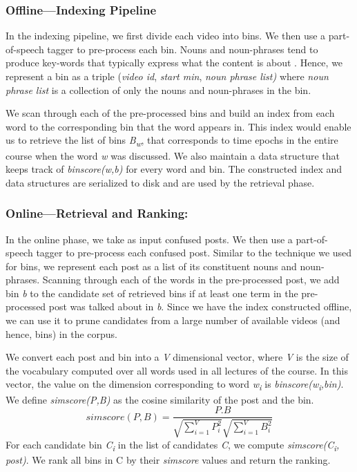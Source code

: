 \documentclass{edm_template}
\begin{document}
\subsubsection{Offline---Indexing Pipeline}
In the indexing pipeline, we first divide each video into bins. We then use a part-of-speech tagger \cite{nltk} to pre-process each bin. Nouns and noun-phrases tend to produce key-words that typically express what the content is about \cite{hulth2003improved}. Hence, we represent a bin as a triple (\textit{video \textunderscore id}, \textit{start \textunderscore min}, \textit{noun \textunderscore phrase \textunderscore list)} where \textit{noun \textunderscore phrase \textunderscore list} is a collection of only the nouns and noun-phrases in the bin.

We scan through each of the pre-processed bins and build an index from each word to the corresponding bin that the word appears in. This index would enable us to retrieve the list of bins \textit{B\textsubscript{w}}, that corresponds to time epochs in the entire course when the word \textit{w} was discussed. We also maintain a data structure that keeps track of \textit{bin\textunderscore score(w,b)} for every word and bin. The constructed index and data structures are serialized to disk and are used by the retrieval phase.
\vspace{-0.3cm}
\subsubsection{Online---Retrieval and Ranking:}
In the online phase, we take as input confused posts. We then use a part-of-speech tagger \cite{nltk} to pre-process each confused post. Similar to the technique we used for bins, we represent each post as a list of its constituent nouns and noun-phrases. Scanning through each of the words in the pre-processed post, we add bin \textit{b} to the candidate set of retrieved bins if at least one term in the pre-processed post was talked about in \textit{b}. Since we have the index constructed offline, we can use it to prune candidates from a large number of available videos (and hence, bins) in the corpus.

We convert each post and bin into a \textit{V} dimensional vector, where \textit{V} is the size of the vocabulary computed over all words used in all lectures of the course. In this vector, the value on the dimension corresponding to word  \textit{w\textsubscript i} is \textit{binscore(w\textsubscript i,bin)}. We define \textit{simscore(P,B)} as the cosine similarity of the post and the bin.
\begin{equation}
simscore(P,B) = \frac{P.B}{\sqrt{\sum\limits_{i=1}^V P_i ^2} \sqrt{\sum\limits_{i=1}^V B_i ^2}  }
\end{equation}
For each candidate bin \textit{C\textsubscript i} in the list of candidates \textit{C}, we compute \textit{simscore(C\textsubscript i, post)}. We rank all bins in C by their \textit{simscore} values and return the ranking.
\end{document}
